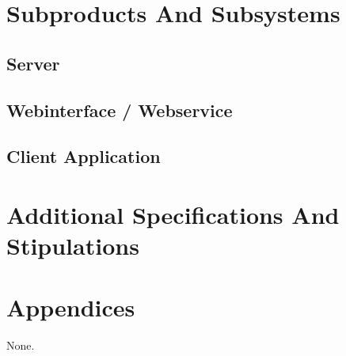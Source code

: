 \documentclass[11pt,a4paper,oneside,svgnames,draft]{report}
\begin{document}
\chapter{Subproducts And Subsystems}
\section{Server}
\section{Webinterface / Webservice}
\section{Client Application}

\chapter{Additional Specifications And Stipulations}
\chapter{Appendices}
None.
\end{document}
